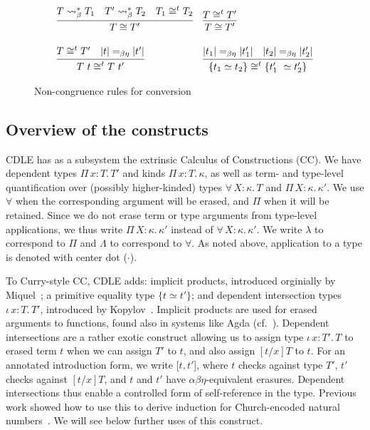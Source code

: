 \documentclass{article}
\newcommand{\abs}[4]{{#1}\, #2\! : \! #3.\, #4}
\begin{document}
\begin{figure}
  \[
  \begin{array}{ll}
    \infer{T \cong T'}{T \leadsto^*_\beta T_1 & T' \leadsto^*_\beta T_2 & T_1\cong^t T_2}  & 
    \infer{T \cong T'}{T \cong^t T'} \\ \\
    \infer{T\ t \cong^t T\ t'}{T \cong^t T' & |t| =_{\beta\eta} |t'|} &
    \infer{\{ t_1 \simeq t_2 \} \cong^t \{ t_1'\ \simeq t_2' \}}{|t_1| =_{\beta\eta} |t_1'| & |t_2| =_{\beta\eta} |t_2'|}
  \end{array}
  \]
  \caption{Non-congruence rules for conversion}
  \label{fig:conv}
\end{figure}  

\subsection{Overview of the constructs}
\label{sec:overview}

CDLE has as a subsystem the extrinsic Calculus of
Constructions (CC).  We have dependent types
$\abs{\Pi}{x}{T}{T'}$ and kinds $\abs{\Pi}{x}{T}{\kappa}$, as well as
term- and type-level quantification over (possibly higher-kinded)
types $\abs{\forall}{X}{\kappa}{T}$ and
$\abs{\Pi}{X}{\kappa}{\kappa'}$.  We use $\forall$ when the
corresponding argument will be erased, and $\Pi$ when it will be
retained.  Since we do not erase term or type arguments from
type-level applications, we thus write $\abs{\Pi}{X}{\kappa}{\kappa'}$
instead of $\abs{\forall}{X}{\kappa}{\kappa'}$.  We write $\lambda$ to
correspond to $\Pi$ and $\Lambda$ to correspond to $\forall$.  As noted
above, application to a type is denoted with center dot ($\cdot$).

To Curry-style CC, CDLE adds: implicit products, introduced orginially
by Miquel~\cite{miquel01}; a primitive equality type $\{ t \simeq
t'\}$; and dependent intersection types $\abs{\iota}{x}{T}{T'}$,
introduced by Kopylov~\cite{kopylov03}.  Implicit products are used
for erased arguments to functions, found also in systems like Agda
(cf.~\cite{mishraLinger08}).  Dependent intersections are a rather
exotic construct allowing us to assign type $\abs{\iota}{x}{T'}{T}$ to
erased term $t$ when we can assign $T'$ to $t$, and also assign
$[t/x]T$ to $t$.  For an annotated introduction form, we write
$[t,t'$], where $t$ checks against type $T'$, $t'$ checks against
$[t/x]T$, and $t$ and $t'$ have $\alpha\beta\eta$-equivalent
erasures.  Dependent intersections thus enable a controlled form of
self-reference in the type.  Previous work showed how to use this to
derive induction for Church-encoded natural numbers~\cite{stump18}.
We will see below further uses of this construct.
\end{document}
